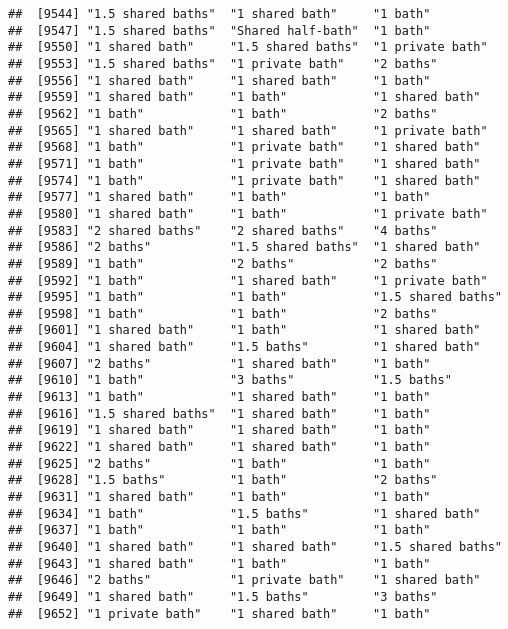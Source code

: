 \documentclass[
]{article}
\begin{document}
\begin{verbatim}
##  [9544] "1.5 shared baths"  "1 shared bath"     "1 bath"           
##  [9547] "1.5 shared baths"  "Shared half-bath"  "1 bath"           
##  [9550] "1 shared bath"     "1.5 shared baths"  "1 private bath"   
##  [9553] "1.5 shared baths"  "1 private bath"    "2 baths"          
##  [9556] "1 shared bath"     "1 shared bath"     "1 bath"           
##  [9559] "1 shared bath"     "1 bath"            "1 shared bath"    
##  [9562] "1 bath"            "1 bath"            "2 baths"          
##  [9565] "1 shared bath"     "1 shared bath"     "1 private bath"   
##  [9568] "1 bath"            "1 private bath"    "1 shared bath"    
##  [9571] "1 bath"            "1 private bath"    "1 shared bath"    
##  [9574] "1 bath"            "1 private bath"    "1 shared bath"    
##  [9577] "1 shared bath"     "1 bath"            "1 bath"           
##  [9580] "1 shared bath"     "1 bath"            "1 private bath"   
##  [9583] "2 shared baths"    "2 shared baths"    "4 baths"          
##  [9586] "2 baths"           "1.5 shared baths"  "1 shared bath"    
##  [9589] "1 bath"            "2 baths"           "2 baths"          
##  [9592] "1 bath"            "1 shared bath"     "1 private bath"   
##  [9595] "1 bath"            "1 bath"            "1.5 shared baths" 
##  [9598] "1 bath"            "1 bath"            "2 baths"          
##  [9601] "1 shared bath"     "1 bath"            "1 shared bath"    
##  [9604] "1 shared bath"     "1.5 baths"         "1 shared bath"    
##  [9607] "2 baths"           "1 shared bath"     "1 bath"           
##  [9610] "1 bath"            "3 baths"           "1.5 baths"        
##  [9613] "1 bath"            "1 shared bath"     "1 bath"           
##  [9616] "1.5 shared baths"  "1 shared bath"     "1 bath"           
##  [9619] "1 shared bath"     "1 shared bath"     "1 bath"           
##  [9622] "1 shared bath"     "1 shared bath"     "1 bath"           
##  [9625] "2 baths"           "1 bath"            "1 bath"           
##  [9628] "1.5 baths"         "1 bath"            "2 baths"          
##  [9631] "1 shared bath"     "1 bath"            "1 bath"           
##  [9634] "1 bath"            "1.5 baths"         "1 shared bath"    
##  [9637] "1 bath"            "1 bath"            "1 bath"           
##  [9640] "1 shared bath"     "1 shared bath"     "1.5 shared baths" 
##  [9643] "1 shared bath"     "1 bath"            "1 bath"           
##  [9646] "2 baths"           "1 private bath"    "1 shared bath"    
##  [9649] "1 shared bath"     "1.5 baths"         "3 baths"          
##  [9652] "1 private bath"    "1 shared bath"     "1 bath"           

\end{verbatim}
\end{document}
